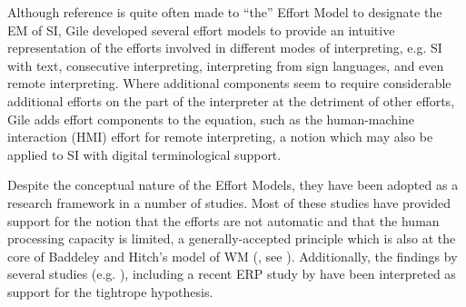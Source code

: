 Although reference is quite often made to ``the'' Effort Model to designate the EM of SI, Gile developed several effort models to provide an intuitive representation of the efforts involved in different modes of interpreting, e.g. SI with text, consecutive interpreting, interpreting from sign languages, and even remote interpreting. Where additional components seem to require considerable additional efforts on the part of the interpreter at the detriment of other efforts, Gile adds effort components to the equation, such as the human-machine interaction (HMI) effort for remote interpreting, a notion which may also be applied to SI with digital terminological support.

Despite the conceptual nature of the Effort Models, they have been adopted as a research framework in a number of studies. Most of these studies have provided support for the notion that the efforts are not automatic \citep[19]{gumul_searching_2018} and that the human processing capacity is limited, a generally-accepted principle which is also at the core of Baddeley and Hitch's model of WM (\citealt{bower_working_1974}, see ). Additionally, the findings by several studies (e.g. \citealt{gile_testing_1999,gumul_searching_2018,gile_errors_2011,matysiak_controlled_2001}), including a recent ERP study by \citet{koshkin_testing_2018} have been interpreted as support for the tightrope hypothesis.

